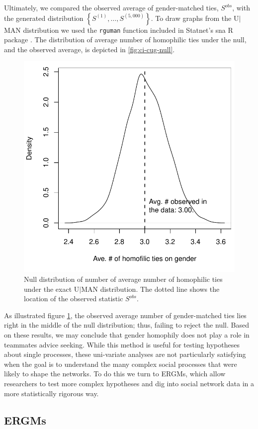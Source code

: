 \documentclass[review, nonatbib,doubleblind]{elsarticle/elsarticle}
\begin{document}
Ultimately, we compared the observed average of gender-matched ties, $S^{obs}$, with the generated distribution $\left\{S^{(1)}, \dots, S^{(5,000)}\right\}$. To draw graphs from the U$|$MAN distribution we used the \texttt{rguman} function included in Statnet's sna R package \cite{butts2016}. The distribution of average number of homophilic ties under the null, and the observed average, is depicted in \autoref{fig:ci-cug-null}.
 
\begin{figure}[tb]
    \centering
    \includegraphics[width=.7\linewidth]{figures/ci-cug-test.pdf}
    \caption{Null distribution of number of average number of homophilic ties under the exact U$|$MAN distribution. The dotted line shows the location of the observed statistic $S^{obs}$.}
    \label{fig:ci-cug-null}
\end{figure}

As illustrated figure \ref{fig:ci-cug-null}, the observed average number of gender-matched ties lies right in the middle of the null distribution; thus, failing to reject the null. Based on these results, we may conclude that gender homophily does not play a role in teammates advice seeking. While this method is useful for testing hypotheses about single processes, these uni-variate analyses are not particularly satisfying when the goal is to understand the many complex social processes that were likely to shape the networks. To do this we turn to ERGMs, which allow researchers to test more complex hypotheses and dig into social network data in a more statistically rigorous way.

\subsection{ERGMs}
\end{document}
